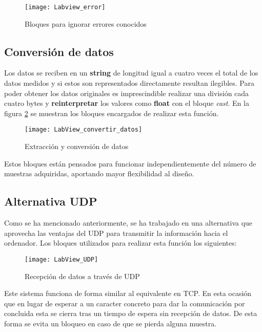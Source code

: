 \begin{figure} [h]
    \centering
    \texttt{[image: Labview\_error]}
    \caption{Bloques para ignorar errores conocidos}
    \label{fig:Labview_error}
\end{figure}

\subsection{Conversión de datos\label{sec:Software_Labview_ConvDatos}}

Los datos se reciben en un \textbf{string} de longitud igual a cuatro veces el total de los datos medidos y si estos son representados directamente resultan ilegibles. Para poder obtener los datos originales es imprescindible realizar una división cada cuatro bytes y \textbf{reinterpretar} los valores como \textbf{float} con el bloque \textit{cast}. En la figura \ref{fig:LabView_convertir_datos} se muestran los bloques encargados de realizar esta función.

\begin{figure} [h]
    \centering
    \texttt{[image: LabView\_convertir\_datos]}
    \caption{Extracción y conversión de datos}
    \label{fig:LabView_convertir_datos}
\end{figure}

Estos bloques están pensados para funcionar independientemente del número de muestras adquiridas, aportando mayor flexibilidad al diseño.

\subsection{Alternativa UDP\label{sec:Software_Labview_AltUDP}}

Como se ha mencionado anteriormente, se ha trabajado en una alternativa que aprovecha las ventajas del UDP para transmitir la información hacia el ordenador. Los bloques utilizados para realizar esta función los siguientes:

\begin{figure} [h]
    \centering
    \texttt{[image: LabView\_UDP]}
    \caption{Recepción de datos a través de UDP}
    \label{fig:LabView_UDP}
\end{figure}

Este sistema funciona de forma similar al equivalente en TCP. En esta ocasión que en lugar de esperar a un caracter concreto para dar la comunicación por concluida esta se cierra tras un tiempo de espera sin recepción de datos. De esta forma se evita un bloqueo en caso de que se pierda alguna muestra.